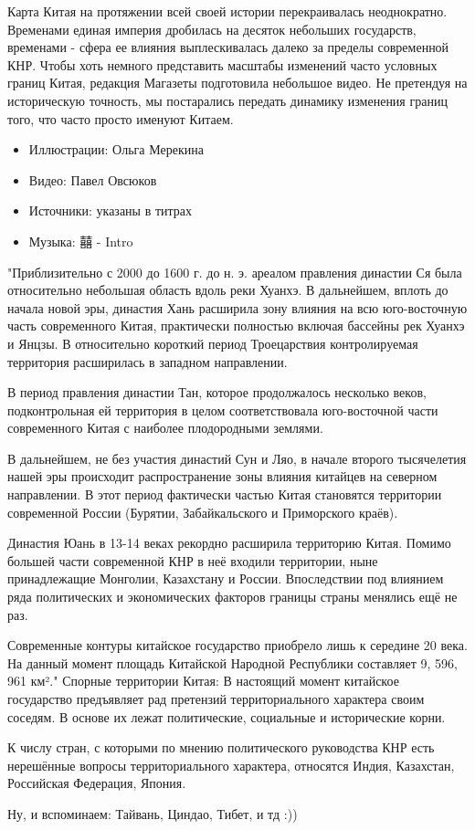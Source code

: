 \begin{itemize}
{Карта Китая на протяжении всей своей истории перекраивалась неоднократно.
Временами единая империя дробилась на десяток небольших государств, временами -
сфера ее влияния выплескивалась далеко за пределы современной КНР. Чтобы хоть
немного представить масштабы изменений часто условных границ Китая, редакция
Магазеты подготовила небольшое видео. Не претендуя на историческую точность, мы
постарались передать динамику изменения границ того, что часто просто именуют
Китаем.

\begin{itemize}
  \item Иллюстрации: Ольга Мерекина
  \item Видео: Павел Овсюков
  \item Источники: указаны в титрах
  \item Музыка: 囍 - Intro
\end{itemize}
}

"Приблизительно с 2000 до 1600 г. до н. э. ареалом правления династии Ся была
относительно небольшая область вдоль реки Хуанхэ. В дальнейшем, вплоть до
начала новой эры, династия Хань расширила зону влияния на всю юго-восточную
часть современного Китая, практически полностью включая бассейны рек Хуанхэ и
Янцзы. В относительно короткий период Троецарствия контролируемая территория
расширилась в западном направлении.

В период правления династии Тан, которое продолжалось несколько веков,
подконтрольная ей территория в целом соответствовала юго-восточной части
современного Китая с наиболее плодородными землями. 

В дальнейшем, не без участия династий Сун и Ляо, в начале второго тысячелетия
нашей эры происходит распространение зоны влияния китайцев на северном
направлении. В этот период фактически частью Китая становятся территории
современной России (Бурятии, Забайкальского и Приморского краёв). 

Династия Юань в 13-14 веках рекордно расширила территорию Китая. Помимо большей
части современной КНР в неё входили территории, ныне принадлежащие Монголии,
Казахстану и России. Впоследствии под влиянием ряда политических и
экономических факторов границы страны менялись ещё не раз. 

Современные контуры китайское государство приобрело лишь к середине 20 века. На
данный момент площадь Китайской Народной Республики составляет 9, 596, 961
км²." Спорные территории Китая: В настоящий момент китайское государство
предъявляет рад претензий территориального характера своим соседям. В основе их
лежат политические, социальные и исторические корни. 

К числу стран, с которыми по мнению политического руководства КНР есть
нерешённые вопросы территориального характера, относятся Индия, Казахстан,
Российская Федерация, Япония. 

Ну, и вспоминаем: Тайвань, Циндао, Тибет, и тд :))

\end{itemize}


